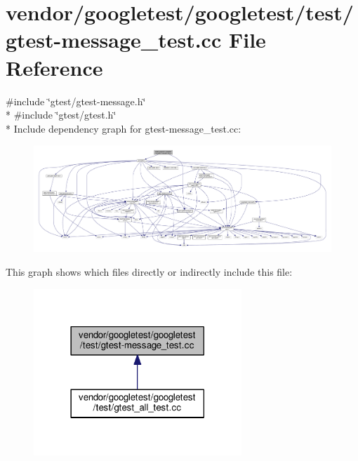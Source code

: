 \hypertarget{gtest-message__test_8cc}{}\section{vendor/googletest/googletest/test/gtest-\/message\+\_\+test.cc File Reference}
\label{gtest-message__test_8cc}
{\ttfamily \#include \char`\"{}gtest/gtest-\/message.\+h\char`\"{}}\\*
{\ttfamily \#include \char`\"{}gtest/gtest.\+h\char`\"{}}\\*
Include dependency graph for gtest-\/message\+\_\+test.cc\+:
\nopagebreak
\begin{figure}[H]
\begin{center}
\leavevmode
\includegraphics[width=350pt]{gtest-message__test_8cc__incl}
\end{center}
\end{figure}
This graph shows which files directly or indirectly include this file\+:
\nopagebreak
\begin{figure}[H]
\begin{center}
\leavevmode
\includegraphics[width=222pt]{gtest-message__test_8cc__dep__incl}
\end{center}
\end{figure}
